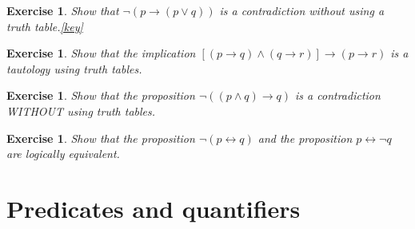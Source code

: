 \documentclass{book}
\newcounter{ekcounter}%
\theoremstyle{ekimcustom}
\newtheorem{exercise}[ekcounter]{Exercise}
\begin{document}
\begin{exercise}
Show that $\neg(p \rightarrow (p \vee q))$ is a contradiction without using a truth table.\quad\quad\href{https://www.sharelatex.com/project/59becd7ec3ef170ecbecf842}{{\color{red}[key]}}
\end{exercise}

\begin{exercise}
Show that the implication $[(p \rightarrow q) \wedge (q \rightarrow r)] \rightarrow (p \rightarrow r)$ is a tautology using truth tables.
\end{exercise}

\begin{exercise}
Show that the proposition $\neg ( (p \wedge q) \rightarrow q)$ is a contradiction WITHOUT using truth tables.
\end{exercise}

\begin{exercise}
Show that the proposition $\neg(p \leftrightarrow q)$ and the proposition $p \leftrightarrow \neg q$ are logically equivalent.
\end{exercise}


\section{Predicates and quantifiers}\label{section:predicates-quantifiers}
\end{document}
